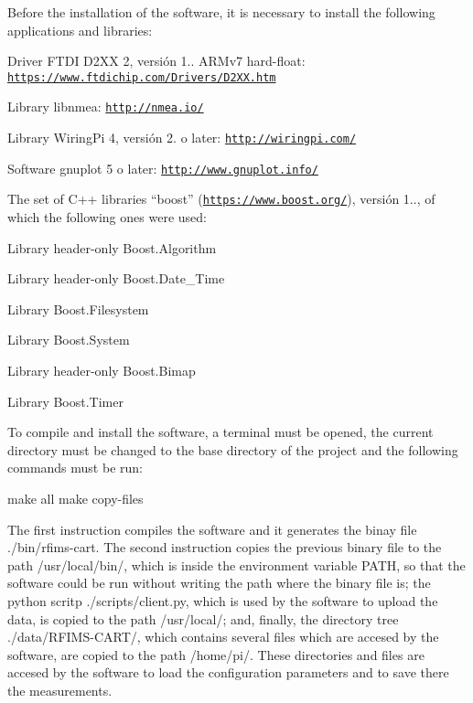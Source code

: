 Before the installation of the software, it is necessary to install the following applications and libraries\+:


\begin{DoxyItemize}
\item Driver F\+T\+DI D2\+XX 2, versión 1.. A\+R\+Mv7 hard-\/float\+: \href{https://www.ftdichip.com/Drivers/D2XX.htm}{\tt https\+://www.\+ftdichip.\+com/\+Drivers/\+D2\+X\+X.\+htm}
\item Library libnmea\+: \href{http://nmea.io/}{\tt http\+://nmea.\+io/}
\item Library Wiring\+Pi 4, versión 2. o later\+: \href{http://wiringpi.com/}{\tt http\+://wiringpi.\+com/}
\item Software gnuplot 5 o later\+: \href{http://www.gnuplot.info/}{\tt http\+://www.\+gnuplot.\+info/}
\item The set of C++ libraries “boost” (\href{https://www.boost.org/}{\tt https\+://www.\+boost.\+org/}), versión 1.., of which the following ones were used\+:
\begin{DoxyItemize}
\item Library header-\/only Boost.\+Algorithm
\item Library header-\/only Boost.\+Date\+\_\+\+Time
\item Library Boost.\+Filesystem
\item Library Boost.\+System
\item Library header-\/only Boost.\+Bimap
\item Library Boost.\+Timer
\end{DoxyItemize}
\end{DoxyItemize}

To compile and install the software, a terminal must be opened, the current directory must be changed to the base directory of the project and the following commands must be run\+: \begin{DoxyVerb}make all
make copy-files
\end{DoxyVerb}


The first instruction compiles the software and it generates the binay file ./bin/rfims-\/cart. The second instruction copies the previous binary file to the path /usr/local/bin/, which is inside the environment variable P\+A\+TH, so that the software could be run without writing the path where the binary file is; the python scritp ./scripts/client.py, which is used by the software to upload the data, is copied to the path /usr/local/; and, finally, the directory tree ./data/\+R\+F\+I\+M\+S-\/\+C\+A\+R\+T/, which contains several files which are accesed by the software, are copied to the path /home/pi/. These directories and files are accesed by the software to load the configuration parameters and to save there the measurements.

